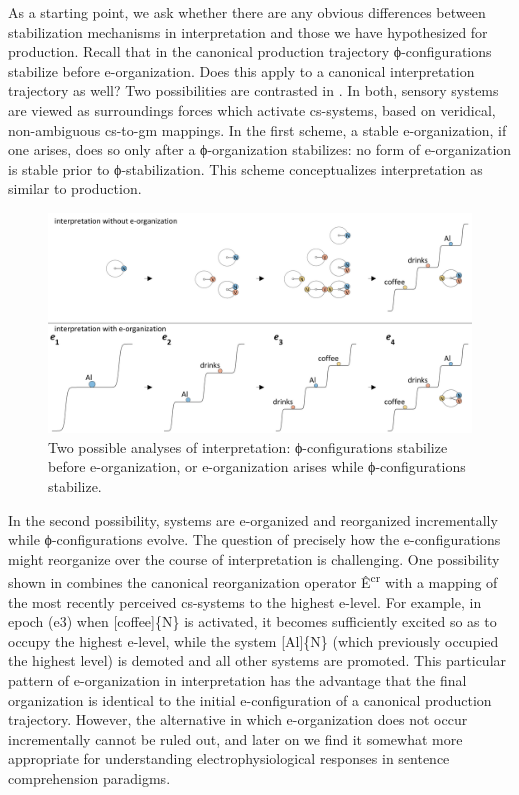   As a starting point, we ask whether there are any obvious differences between stabilization mechanisms in interpretation and those we have hypothesized for production. Recall that in the canonical production trajectory ϕ-configurations stabilize before e-organization. Does this apply to a canonical interpretation trajectory as well? Two possibilities are contrasted in {}. In both, sensory systems are viewed as surroundings forces which activate cs-systems, based on veridical, non-ambiguous cs-to-gm mappings. In the first scheme, a stable e-organization, if one arises, does so only after a ϕ-organization stabilizes: no form of e-organization is stable prior to ϕ-stabilization. This scheme conceptualizes interpretation as similar to production.

  
\begin{figure}
\includegraphics[width=\textwidth]{figures/Tilsen-img90.png}
\caption{Two possible analyses of interpretation: ϕ-configurations stabilize before e-organization, or e-organization arises while ϕ-configurations stabilize.}
\label{fig:4:40}
\end{figure}
 

  In the second possibility, systems are e-organized and reorganized incrementally while ϕ-configurations evolve. The question of precisely how the e-configurations might reorganize over the course of interpretation is challenging. One possibility shown in {} combines the canonical reorganization operator Ê\textsuperscript{cr} with a mapping of the most recently perceived cs-systems to the highest e-level. For example, in epoch (e3) when [coffee]\{N\} is activated, it becomes sufficiently excited so as to occupy the highest e-level, while the system [Al]\{N\} (which previously occupied the highest level) is demoted and all other systems are promoted. This particular pattern of e-organization in interpretation has the advantage that the final organization is identical to the initial e-configuration of a canonical production trajectory. However, the alternative in which e-organization does not occur incrementally cannot be ruled out, and later on we find it somewhat more appropriate for understanding electrophysiological responses in sentence comprehension paradigms.

